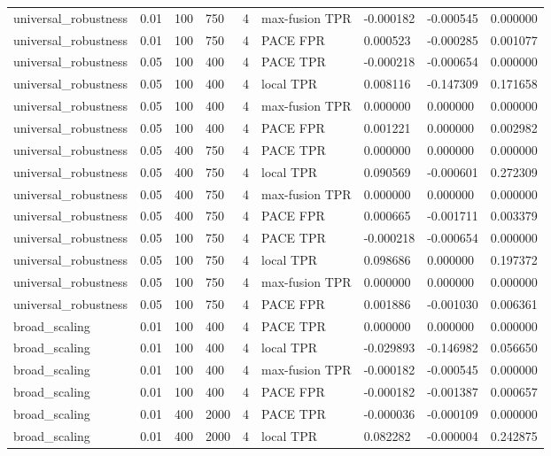 \begin{tabular}{lllllllll}
universal\_robustness & 0.01 & 100 & 750 & 4 & max-fusion TPR & -0.000182 & -0.000545 & 0.000000 \\
universal\_robustness & 0.01 & 100 & 750 & 4 & PACE FPR & 0.000523 & -0.000285 & 0.001077 \\
universal\_robustness & 0.05 & 100 & 400 & 4 & PACE TPR & -0.000218 & -0.000654 & 0.000000 \\
universal\_robustness & 0.05 & 100 & 400 & 4 & local TPR & 0.008116 & -0.147309 & 0.171658 \\
universal\_robustness & 0.05 & 100 & 400 & 4 & max-fusion TPR & 0.000000 & 0.000000 & 0.000000 \\
universal\_robustness & 0.05 & 100 & 400 & 4 & PACE FPR & 0.001221 & 0.000000 & 0.002982 \\
universal\_robustness & 0.05 & 400 & 750 & 4 & PACE TPR & 0.000000 & 0.000000 & 0.000000 \\
universal\_robustness & 0.05 & 400 & 750 & 4 & local TPR & 0.090569 & -0.000601 & 0.272309 \\
universal\_robustness & 0.05 & 400 & 750 & 4 & max-fusion TPR & 0.000000 & 0.000000 & 0.000000 \\
universal\_robustness & 0.05 & 400 & 750 & 4 & PACE FPR & 0.000665 & -0.001711 & 0.003379 \\
universal\_robustness & 0.05 & 100 & 750 & 4 & PACE TPR & -0.000218 & -0.000654 & 0.000000 \\
universal\_robustness & 0.05 & 100 & 750 & 4 & local TPR & 0.098686 & 0.000000 & 0.197372 \\
universal\_robustness & 0.05 & 100 & 750 & 4 & max-fusion TPR & 0.000000 & 0.000000 & 0.000000 \\
universal\_robustness & 0.05 & 100 & 750 & 4 & PACE FPR & 0.001886 & -0.001030 & 0.006361 \\
broad\_scaling & 0.01 & 100 & 400 & 4 & PACE TPR & 0.000000 & 0.000000 & 0.000000 \\
broad\_scaling & 0.01 & 100 & 400 & 4 & local TPR & -0.029893 & -0.146982 & 0.056650 \\
broad\_scaling & 0.01 & 100 & 400 & 4 & max-fusion TPR & -0.000182 & -0.000545 & 0.000000 \\
broad\_scaling & 0.01 & 100 & 400 & 4 & PACE FPR & -0.000182 & -0.001387 & 0.000657 \\
broad\_scaling & 0.01 & 400 & 2000 & 4 & PACE TPR & -0.000036 & -0.000109 & 0.000000 \\
broad\_scaling & 0.01 & 400 & 2000 & 4 & local TPR & 0.082282 & -0.000004 & 0.242875 \\

\end{tabular}
